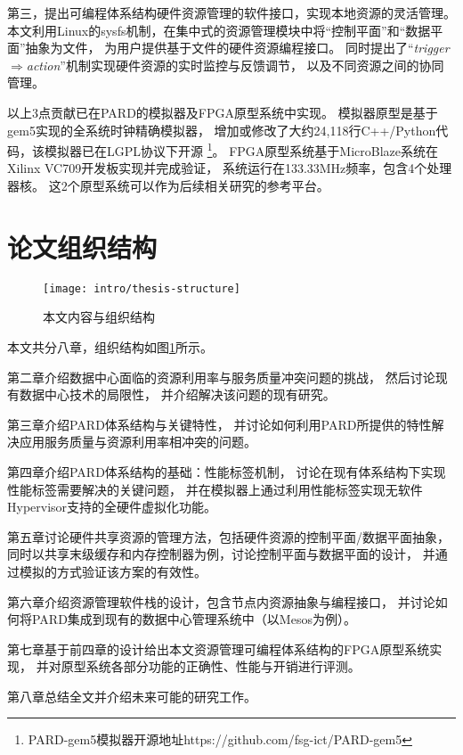 第三，提出可编程体系结构硬件资源管理的软件接口，实现本地资源的灵活管理。
本文利用Linux的sysfs机制，在集中式的资源管理模块中将``控制平面''和``数据平面''抽象为文件，
为用户提供基于文件的硬件资源编程接口。
同时提出了``\emph{trigger$\Rightarrow$action}''机制实现硬件资源的实时监控与反馈调节，
以及不同资源之间的协同管理。


以上3点贡献已在PARD的模拟器及FPGA原型系统中实现。
模拟器原型是基于gem5\cite{binkert_gem5_2011}实现的全系统时钟精确模拟器，
增加或修改了大约24,118行C++/Python代码，该模拟器已在LGPL协议下开源
\footnote{PARD-gem5模拟器开源地址https://github.com/fsg-ict/PARD-gem5}。
FPGA原型系统基于MicroBlaze系统在Xilinx VC709开发板实现并完成验证，
系统运行在133.33MHz频率，包含4个处理器核。
这2个原型系统可以作为后续相关研究的参考平台。


\section{论文组织结构}

\begin{figure}[htb]
  \centering
  \texttt{[image: intro/thesis-structure]}
  \caption{本文内容与组织结构}
  \label{fig:thesis-structure}
\end{figure}

本文共分八章，组织结构如图\ref{fig:thesis-structure}所示。

第二章介绍数据中心面临的资源利用率与服务质量冲突问题的挑战，
然后讨论现有数据中心技术的局限性，
并介绍解决该问题的现有研究。

第三章介绍PARD体系结构与关键特性，
并讨论如何利用PARD所提供的特性解决应用服务质量与资源利用率相冲突的问题。

第四章介绍PARD体系结构的基础：性能标签机制，
讨论在现有体系结构下实现性能标签需要解决的关键问题，
并在模拟器上通过利用性能标签实现无软件Hypervisor支持的全硬件虚拟化功能。

第五章讨论硬件共享资源的管理方法，包括硬件资源的控制平面/数据平面抽象，
同时以共享末级缓存和内存控制器为例，讨论控制平面与数据平面的设计，
并通过模拟的方式验证该方案的有效性。

第六章介绍资源管理软件栈的设计，包含节点内资源抽象与编程接口，
并讨论如何将PARD集成到现有的数据中心管理系统中（以Mesos\cite{Hindman:2011:Mesos}为例）。

第七章基于前四章的设计给出本文资源管理可编程体系结构的FPGA原型系统实现，
并对原型系统各部分功能的正确性、性能与开销进行评测。

第八章总结全文并介绍未来可能的研究工作。

